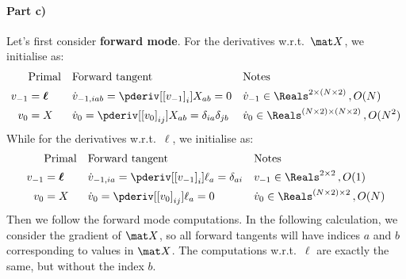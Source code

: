 \paragraph{Part c)} Let's first consider \textbf{forward mode}. For the derivatives w.r.t.~$\mat X$, we initialise as:
\begin{align}
&\text{Primal} && \text{Forward tangent} && \text{Notes} \nonumber \\
v_{-1} &= \boldsymbol \ell && \dot v_{-1,iab} = \pderiv[{[v_{-1}]}_{i}]{X_{ab}} = 0 && \dot v_{-1} \in \Reals^{2 \times (N\times 2)}\,, O(N) \\ %
v_0 &= X && \dot v_0 = \pderiv[{[v_0]}_{ij}]{X_{ab}} = \delta_{ia}\delta_{jb}  &&  \dot v_0 \in \Reals^{(N\times 2)\times (N\times 2)}\,, O(N^2)
\end{align}
While for the derivatives w.r.t.~$\boldsymbol \ell$, we initialise as:
\begin{align}
&\text{Primal} && \text{Forward tangent} && \text{Notes} \nonumber \\
v_{-1} &= \boldsymbol \ell && \dot v_{-1,ia} = \pderiv[{[v_{-1}]}_{i}]{\ell_{a}} = \delta_{ai} && v_{-1} \in \Reals^{2 \times 2}\,, O(1) \\ %
v_0 &= X && \dot v_0 = \pderiv[{[v_0]}_{ij}]{\ell_{a}} = 0  &&  \dot v_0 \in \Reals^{(N\times 2)\times 2}\,, O(N) \\
\end{align}
Then we follow the forward mode computations. In the following calculation, we consider the gradient of $\mat X$, so all forward tangents will have indices $a$ and $b$ corresponding to values in $\mat X$. The computations w.r.t.~$\boldsymbol \ell$ are exactly the same, but without the index $b$.
